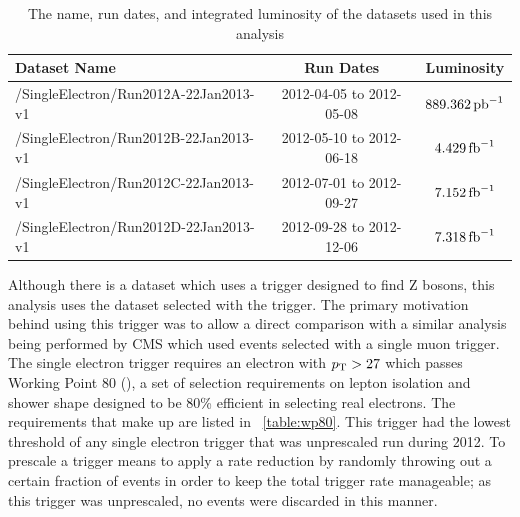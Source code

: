 \begin{table}[h]
\centering
{}
\begin{center}
    \begin{tabular}{@{}l c c@{}}
    \toprule
    Dataset Name                          & Run Dates                & Luminosity       \\
    \midrule
    /SingleElectron/Run2012A-22Jan2013-v1 & 2012-04-05 to 2012-05-08 & $889.362 \mbox{\ensuremath{\,\text{pb}^\text{$-$1}}}$ \\
    /SingleElectron/Run2012B-22Jan2013-v1 & 2012-05-10 to 2012-06-18 & $4.429 \mbox{\ensuremath{\,\text{fb}^\text{$-$1}}}$   \\
    /SingleElectron/Run2012C-22Jan2013-v1 & 2012-07-01 to 2012-09-27 & $7.152 \mbox{\ensuremath{\,\text{fb}^\text{$-$1}}}$   \\
    /SingleElectron/Run2012D-22Jan2013-v1 & 2012-09-28 to 2012-12-06 & $7.318 \mbox{\ensuremath{\,\text{fb}^\text{$-$1}}}$   \\
    \bottomrule
    \end{tabular}
\end{center}
\caption{
    The name, run dates, and integrated luminosity of the datasets used in this
    analysis
}
\label{table:datasets}
\end{table}

Although there is a \DoubleElectron dataset which uses a trigger designed to
find Z bosons, this analysis uses the \SingleElectron dataset selected with the
\SingleElectronTrigger trigger. The primary motivation behind using this
trigger was to allow a direct comparison with a similar \phistar analysis being
performed by CMS which used \Ztomumu events selected with a single muon
trigger. The single electron trigger requires an electron with $p_{\mathrm{T}} > 27$ which
passes Working Point 80 (\WPEighty), a set of selection requirements on lepton
isolation and shower shape designed to be 80\% efficient in selecting real
electrons. The requirements that make up \WPEighty are listed in
\TAB~\ref{table:wp80}. This trigger had the lowest \pt threshold of any single
electron trigger that was unprescaled run during 2012. To prescale a trigger
means to apply a rate reduction by randomly throwing out a certain fraction of
events in order to keep the total trigger rate manageable; as this trigger was
unprescaled, no events were discarded in this manner.

